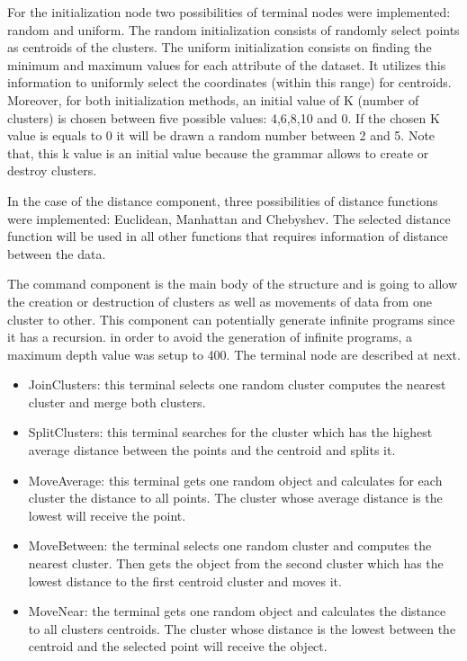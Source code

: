 \documentclass[journal]{IEEEtran}
\begin{document}
	For the initialization node two possibilities of terminal nodes were implemented: random and uniform. The random initialization consists of randomly select points as centroids of the clusters. The uniform initialization consists on finding the minimum and maximum values for each attribute of the dataset. It utilizes this information to uniformly select the coordinates (within this range) for centroids. Moreover, for both initialization methods, an initial value of K (number of clusters) is chosen between five possible values: 4,6,8,10 and 0. If the chosen K value is equals to 0 it will be drawn a random number between 2 and 5. Note that, this k value is an initial value because the grammar allows to create or destroy clusters. 
	
	In the case of the distance component, three possibilities of distance functions were implemented: Euclidean, Manhattan and Chebyshev. The selected distance function will be used in all other functions that requires information of distance between the data. 
	
	The command component is the main body of the structure and is going to allow the creation or destruction of clusters as well as movements of data from one cluster to other.  This component can potentially generate infinite programs since it has a recursion. in order to avoid the generation of infinite programs, a maximum depth value was setup to 400. The  terminal node are described at next.
	
	\begin{itemize}
		\item JoinClusters: this terminal selects one random cluster computes the nearest cluster and merge both clusters.
		\item SplitClusters: this terminal searches for the cluster which has the highest average distance between the points and the centroid and splits it. 
		\item MoveAverage:  this terminal gets one random object and calculates for each cluster the distance to all points. The cluster whose average distance is the lowest will receive the point.
		\item MoveBetween: the terminal selects one random cluster and computes the nearest cluster. Then gets the object from the second cluster which has the lowest distance to the first centroid cluster and moves it.
		\item MoveNear:  the terminal gets one random object and calculates the distance to all clusters centroids. The cluster whose distance is the lowest between the centroid and the selected point will receive the object.
	\end{itemize}
	
\end{document}
